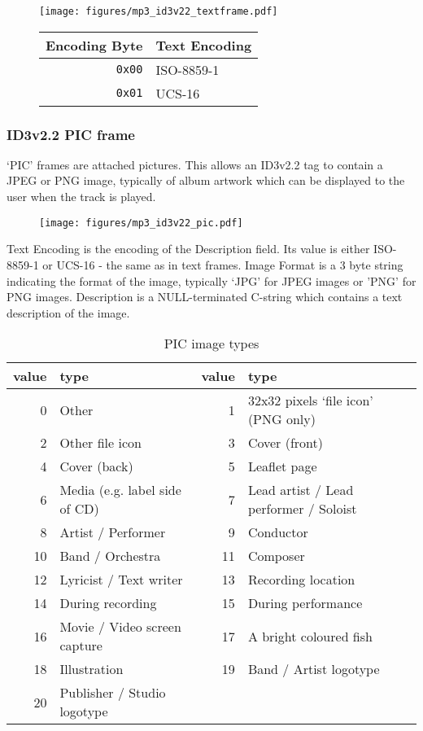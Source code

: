 \pagebreak

\begin{figure}[h]
\texttt{[image: figures/mp3\_id3v22\_textframe.pdf]}
\begin{tabular}{r|l}
Encoding Byte & Text Encoding \\
\hline
\texttt{0x00} & ISO-8859-1 \\
\texttt{0x01} & UCS-16 \\
\end{tabular}
\end{figure}

\subsubsection{ID3v2.2 PIC frame}

`PIC' frames are attached pictures.
This allows an ID3v2.2 tag to contain a JPEG or PNG image,
typically of album artwork which can be displayed to the user
when the track is played.

\begin{figure}[h]
\texttt{[image: figures/mp3\_id3v22\_pic.pdf]}
\end{figure}
\par
\noindent
Text Encoding is the encoding of the Description field.
Its value is either ISO-8859-1 or UCS-16 - the same as in
text frames.
Image Format is a 3 byte string indicating the format of the image,
typically `JPG' for JPEG images or 'PNG' for PNG images.
Description is a NULL-terminated C-string which contains
a text description of the image.

\begin{table}[h]
{
\begin{tabular}{|r|l||r|l|}
\hline
value & type & value & type \\
\hline
0 & Other & 1 & 32x32 pixels `file icon' (PNG only) \\
2 & Other file icon & 3 & Cover (front) \\
4 & Cover (back) & 5 & Leaflet page \\
6 & Media (e.g. label side of CD) & 7 & Lead artist / Lead performer / Soloist \\
8 & Artist / Performer & 9 & Conductor \\
10 & Band / Orchestra & 11 & Composer \\
12 & Lyricist / Text writer & 13 & Recording location \\
14 & During recording & 15 & During performance \\
16 & Movie / Video screen capture & 17 & A bright coloured fish \\
18 & Illustration & 19 & Band / Artist logotype \\
20 & Publisher / Studio logotype & &  \\
\hline
\end{tabular}
\caption{PIC image types}
}
\end{table}

